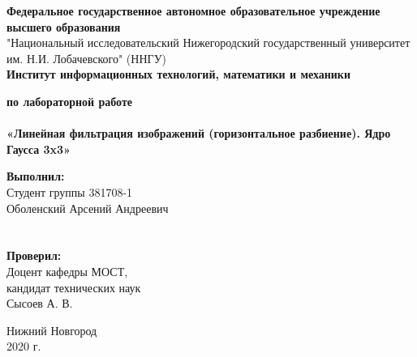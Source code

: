 \documentclass{report}
\begin{document}
    \begin{titlepage}

        \begin{center}
            \textbf{Федеральное государственное автономное образовательное учреждение высшего образования} \\
            "Национальный исследовательский Нижегородский государственный университет им. Н.И. Лобачевского" (ННГУ) \\
            \textbf{Институт информационных технологий, математики и механики}

            \vspace{\fill}

            \textbf{ по лабораторной работе \\}
            \textbf{\large\\ «Линейная фильтрация изображений (горизонтальное разбиение). Ядро Гаусса 3x3»}

            \vspace{\fill}

            \hfill\parbox{8cm}{
                \hspace*{5cm}\hspace*{-5cm}\textbf{Выполнил:} \\ Студент группы 381708-1 \\ Оболенский Арсений Андреевич \\ \\ \\
                \hspace*{5cm}\hspace*{-5cm}\textbf{Проверил:}\\ Доцент кафедры МОСТ, \\ кандидат технических наук \\ Сысоев А. В.
            }

            \vspace{\fill}

            Нижний Новгород \\ 2020 г.
        \end{center}

    \end{titlepage}

    \setcounter{page}{2}
    \setlength{\cftsecindent}{0em}
    \setlength{\cftsubsecindent}{1.25em}
    \setlength{\cftsubsubsecindent}{2.5em}
    \setlength{\cftsubsubsecnumwidth}{1.25em}
    \tableofcontents
\end{document}
